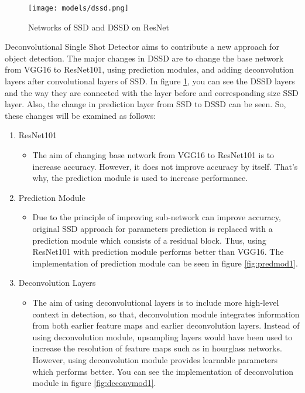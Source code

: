 \documentclass{article}
\begin{document}
\setlength{\parindent}{6ex}

\begin{figure}
    \centering
    \texttt{[image: models/dssd.png]}
    \caption{Networks of SSD and DSSD on ResNet}
    \label{fig:dssd1}
\end{figure}

\indent

Deconvolutional Single Shot Detector \cite{dssdcite} aims to contribute a new approach for object 
detection. The major changes in DSSD are to change the base network from VGG16 to 
ResNet101, using prediction modules, and adding deconvolution layers after convolutional 
layers of SSD. In figure \ref{fig:dssd1}, you can see the DSSD layers and the way they are 
connected with the layer before and corresponding size SSD layer. Also, the change in 
prediction layer from SSD to DSSD can be seen. So, these changes will be examined as follows: 
\begin{enumerate}
    \item ResNet101
    \begin{itemize}
        \item The aim of changing base network from VGG16 to ResNet101 is to 
increase accuracy. However, it does not improve accuracy by itself. That's why, 
the prediction module is used to increase performance.
    \end{itemize}
    \item Prediction Module
    \begin{itemize}
        \item Due to the principle of improving sub-network can improve accuracy, 
original SSD approach for parameters prediction is replaced with a prediction module which 
consists of a residual block. Thus, using ResNet101 with prediction module performs 
better than VGG16. The implementation of prediction module can be seen in figure 
\ref{fig:predmod1}.
    \end{itemize}
    \item Deconvolution Layers
    \begin{itemize}
        \item The aim of using deconvolutional layers is to include more high-level 
context in detection, so that, deconvolution module integrates information from both 
earlier feature maps and earlier deconvolution layers. Instead of using deconvolution 
module, upsampling layers would have been used to increase the resolution of feature 
maps such as in hourglass networks. However, using deconvolution module provides 
learnable parameters which performs better. You can see the implementation of 
deconvolution module in figure \ref{fig:deconvmod1}.
    \end{itemize}
\end{enumerate}
\end{document}
